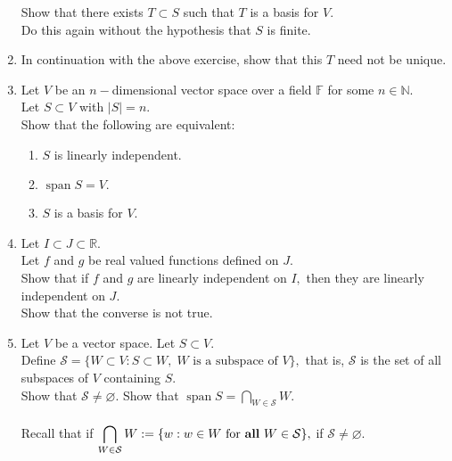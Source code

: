 \documentclass[12pt]{article}
\let\emptyset\varnothing
\begin{document}
\begin{enumerate}[leftmargin=*]
	Show that there exists $T \subset S$ such that $T$ is a basis for $V.$\\
	Do this again without the hypothesis that $S$ is finite.
	\item In continuation with the above exercise, show that this $T$ need not be unique.
	\item Let $V$ be an $n-$dimensional vector space over a field $\mathbb{F}$ for some $n \in \mathbb{N}.$\\
	Let $S \subset V$ with $|S| = n.$\\
	Show that the following are equivalent:
	\begin{enumerate} 
		\item $S$ is linearly independent.
		\item $\operatorname{span} S = V.$
		\item $S$ is a basis for $V.$
	\end{enumerate}
	\item Let $I \subset J \subset \mathbb{R}.$\\
	Let $f$ and $g$ be real valued functions defined on $J.$\\
	Show that if $f$ and $g$ are linearly independent on $I,$ then they are linearly independent on $J.$\\
	Show that the converse is not true.
	\item Let $V$ be a vector space. Let $S \subset V.$\\
	Define $\mathcal{S} = \{W \subset V : S \subset W,\;W \text{ is a subspace of }V\},$ that is, $\mathcal{S}$ is the set of all subspaces of $V$ containing $S.$\\
	Show that $\mathcal{S} \neq \emptyset.$
	Show that $\operatorname{span} S = \displaystyle\bigcap_{W \in \mathcal{S}} W.$\\~\\
	Recall that if $\displaystyle\bigcap_{W \in \mathcal{S}} W := \{w : w \in W \text{ for \textbf{all} }W \in \mathcal{S} \},$ if $\mathcal{S} \neq \emptyset.$
\end{enumerate}
\end{document}
